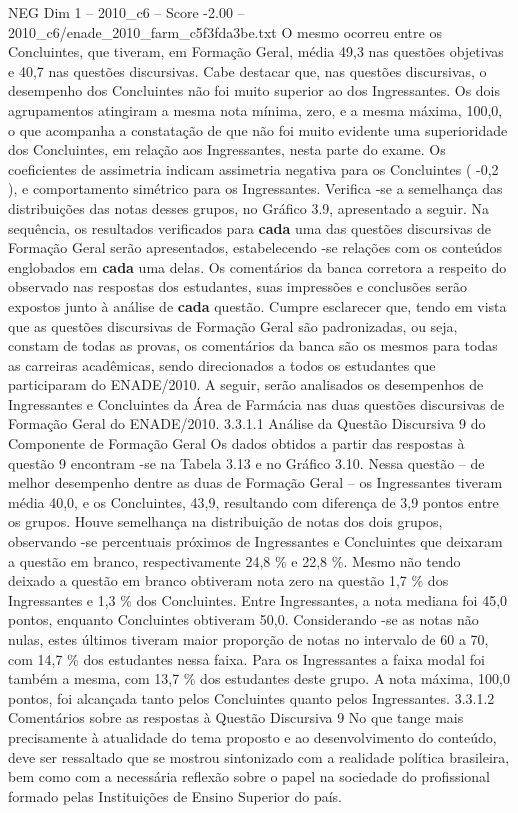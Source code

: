 \begin{textsample}{NEG Dim 1 – 2010\_c6 – Score -2.00 – 2010\_c6/enade\_2010\_farm\_c5f3fda3be.txt}
O mesmo ocorreu entre os Concluintes, que tiveram, em Formação Geral, média 49,3 nas questões objetivas e 40,7 nas questões discursivas.
Cabe destacar que, nas questões discursivas, o desempenho dos Concluintes não foi muito superior ao dos Ingressantes.
Os dois agrupamentos atingiram a mesma nota mínima, zero, e a mesma máxima, 100,0, o que acompanha a constatação de que não foi muito evidente uma superioridade dos Concluintes, em relação aos Ingressantes, nesta parte do exame.
Os coeficientes de assimetria indicam assimetria negativa para os Concluintes ( -0,2 ), e comportamento simétrico para os Ingressantes.
Verifica -se a semelhança das distribuições das notas desses grupos, no Gráfico 3.9, apresentado a seguir.
Na sequência, os resultados verificados para \textbf{cada} uma das questões discursivas de Formação Geral serão apresentados, estabelecendo -se relações com os conteúdos englobados em \textbf{cada} uma delas.
Os comentários da banca corretora a respeito do observado nas respostas dos estudantes, suas impressões e conclusões serão expostos junto à análise de \textbf{cada} questão.
Cumpre esclarecer que, tendo em vista que as questões discursivas de Formação Geral são padronizadas, ou seja, constam de todas as provas, os comentários da banca são os mesmos para todas as carreiras acadêmicas, sendo direcionados a todos os estudantes que participaram do ENADE/2010.
A seguir, serão analisados os desempenhos de Ingressantes e Concluintes da Área de Farmácia nas duas questões discursivas de Formação Geral do ENADE/2010. 3.3.1.1 Análise da Questão Discursiva 9 do Componente de Formação Geral Os dados obtidos a partir das respostas à questão 9 encontram -se na Tabela 3.13 e no Gráfico 3.10.
Nessa questão – de melhor desempenho dentre as duas de Formação Geral – os Ingressantes tiveram média 40,0, e os Concluintes, 43,9, resultando com diferença de 3,9 pontos entre os grupos.
Houve semelhança na distribuição de notas dos dois grupos, observando -se percentuais próximos de Ingressantes e Concluintes que deixaram a questão em branco, respectivamente 24,8 \% e 22,8 \%.
Mesmo não tendo deixado a questão em branco obtiveram nota zero na questão 1,7 \% dos Ingressantes e 1,3 \% dos Concluintes.
Entre Ingressantes, a nota mediana foi 45,0 pontos, enquanto Concluintes obtiveram 50,0.
Considerando -se as notas não nulas, estes últimos tiveram maior proporção de notas no intervalo de 60 a 70, com 14,7 \% dos estudantes nessa faixa.
Para os Ingressantes a faixa modal foi também a mesma, com 13,7 \% dos estudantes deste grupo.
A nota máxima, 100,0 pontos, foi alcançada tanto pelos Concluintes quanto pelos Ingressantes. 3.3.1.2 Comentários sobre as respostas à Questão Discursiva 9 No que tange mais precisamente à atualidade do tema proposto e ao desenvolvimento do conteúdo, deve ser ressaltado que se mostrou sintonizado com a realidade política brasileira, bem como com a necessária reflexão sobre o papel na sociedade do profissional formado pelas Instituições de Ensino Superior do país.

\end{textsample}
